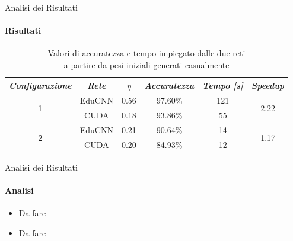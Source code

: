 \documentclass[
 ]{beamer}
\begin{document}
\begin{frame}{Analisi dei Risultati}
    \framesubtitle{Risultati}

        \begin{table}
            \centering
            \renewcommand\arraystretch{1.3}
            \small
            \begin{tabular}{| c | c | c | c | c | c |}
                \hline
                \emph{Configurazione} & \emph{Rete} & $\eta$ & \emph{Accuratezza} & \emph{Tempo [s]} & \emph{Speedup} \\
                \hline
                \multirow{2}{*}{1} & EduCNN & 0.56 & 97.60\% & 121 & \multirow{2}{*}{2.22} \\ \cline{2-5} 
                                   & CUDA   & 0.18 & 93.86\% & 55 & \\                               
                \hline
                \multirow{2}{*}{2} & EduCNN & 0.21 & 90.64\% & 14 & \multirow{2}{*}{1.17} \\ \cline{2-5}
                                   & CUDA   & 0.20 & 84.93\% & 12 & \\
                \hline                                 
            \end{tabular}
            \caption            
    {Valori di accuratezza e tempo impiegato dalle due reti \\ a partire da pesi iniziali generati casualmente \endtabular}          
        \end{table}    
\end{frame}

\begin{frame}{Analisi dei Risultati}
    \framesubtitle{Analisi}
    \smallskip
    \begin{itemize} [<+->]
        \setlength\itemsep{2em}
        \item \large Da fare %
        \item \large Da fare %
    \end{itemize}     
\end{frame}
\end{document}
